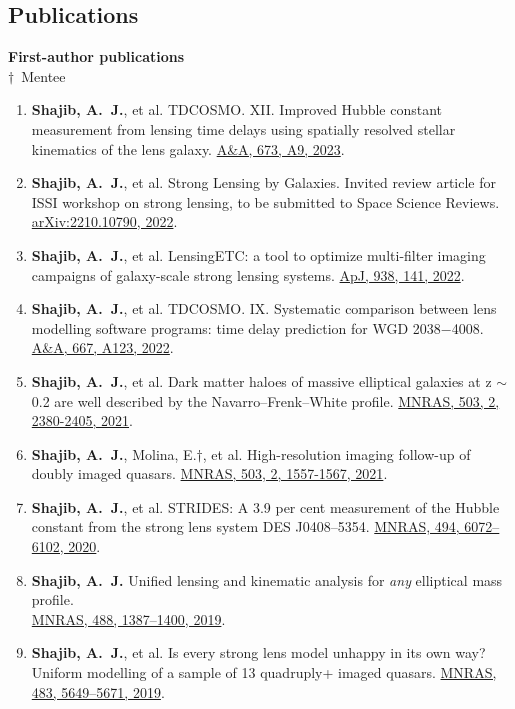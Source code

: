 \documentclass[margin, line]{res}
\begin{document}
\begin{resume}
\section{\sc Publications}
\textbf{First-author publications}
\newcommand{\mentee}{${\boldsymbol{\dagger}}$}
\\ \mentee\ Mentee
\begin{enumerate}
	\item \textbf{Shajib, A.~J.}, et al. TDCOSMO. XII. Improved Hubble constant measurement from lensing time delays using spatially resolved stellar kinematics of the lens galaxy. \href{https://ui.adsabs.harvard.edu/abs/2023arXiv230102656S/abstract}{A\&A, 673, A9, 2023}.
	\item \textbf{Shajib, A.~J.}, et al. Strong Lensing by Galaxies. Invited review article for ISSI workshop on strong lensing, to be submitted to Space Science Reviews. \href{https://arxiv.org/abs/2210.10790}{arXiv:2210.10790, 2022}.
	\item \textbf{Shajib, A.~J.}, et al. LensingETC: a tool to optimize multi-filter imaging campaigns of galaxy-scale strong lensing systems. \href{https://doi.org/10.3847/1538-4357/ac927b}{ApJ, 938, 141, 2022}.
	\item \textbf{Shajib, A.~J.}, et al. TDCOSMO. IX. Systematic comparison between lens modelling software programs: time delay prediction for WGD 2038$-$4008. \href{https://arxiv.org/abs/2202.11101}{A\&A, 667, A123, 2022}.
	\item \textbf{Shajib, A.~J.}, et al. Dark matter haloes of massive elliptical galaxies at z $\sim$ 0.2 are well described by the Navarro--Frenk--White profile. \href{https://doi.org/10.1093/mnras/stab536}{MNRAS, 503, 2, 2380-2405, 2021}.
	\item \textbf{Shajib, A.~J.}, Molina, E.{\mentee}, et al. High-resolution imaging follow-up of doubly imaged quasars. \href{https://doi:10.1093/mnras/stab532}{MNRAS, 503, 2, 1557-1567, 2021}.
	\item \textbf{Shajib, A.~J.}, et al. STRIDES: A 3.9 per cent measurement of the Hubble constant from the strong lens system DES J0408--5354. \href{https://academic.oup.com/mnras/advance-article-abstract/doi/10.1093/mnras/staa828/5813265}{MNRAS, 494, 6072--6102, 2020}.
	\item \textbf{Shajib, A.~J.} Unified lensing and kinematic analysis for \textit{any} elliptical mass profile. \\ \href{https://doi.org/10.1093/mnras/stz1796}{MNRAS, 488, 1387--1400, 2019}.
	\item \textbf{Shajib, A.~J.}, et al. Is every strong lens model unhappy in its own way? Uniform modelling of a sample of 13 quadruply+ imaged quasars. \href{https://doi.org/10.1093/mnras/sty3397}{MNRAS, 483, 5649--5671, 2019}.

\end{enumerate}
\end{resume}
\end{document}
